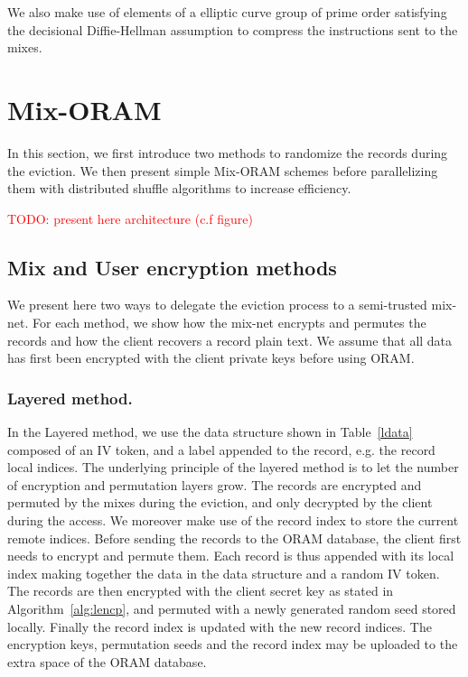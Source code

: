 \documentclass[USenglish,oneside,twocolumn]{article}
\newcommand{\todo}[1]{\textcolor{red}{TODO: #1}}
\begin{document}
We also make use of elements of a elliptic curve group of prime order satisfying the decisional Diffie-Hellman assumption to compress the instructions sent to the mixes.
%
\section{Mix-ORAM}\label{Mix-ORAM}
In this section, we first introduce two methods to randomize the records during the eviction. We then present simple Mix-ORAM schemes before parallelizing them with distributed shuffle algorithms to increase efficiency.

\todo{present here architecture (c.f figure)}
 
%
\subsection{Mix and User encryption methods}\label{Enc}
We present here two ways to delegate the eviction process to a semi-trusted mix-net. For each method, we show how the mix-net encrypts and permutes the records and how the client recovers a record plain text.
We assume that all data has first been encrypted with the client private keys  before using ORAM. 

\subsubsection{Layered method.}
In the Layered method, we use the data structure shown in Table~\ref{ldata} composed of an IV token, and a label appended to the record, e.g. the record local indices. The underlying principle of the layered method is to let the number of encryption and permutation layers grow. The records are encrypted and permuted by the mixes during the eviction, and only decrypted by the client during the access. We moreover make use of the record index to store the current remote indices. %
Before sending the records to the ORAM database, the client first needs to encrypt and permute them. Each record is thus appended with its local index making together the data in the data structure and a random IV token. The records are then encrypted with the client secret key as stated in Algorithm~\ref{alg:lencp}, and permuted with a newly generated random seed stored locally. Finally the record index is updated with the new record indices. The encryption keys, permutation seeds and the record index may be uploaded to the extra space of the ORAM database.\\
\end{document}

